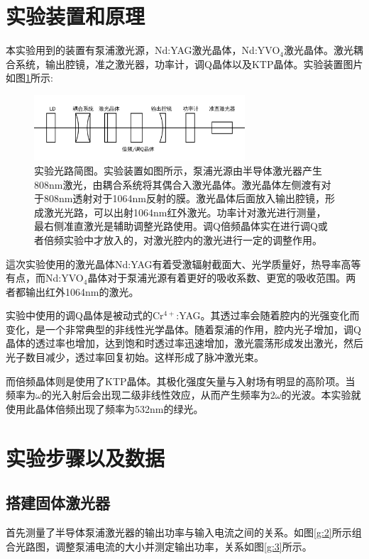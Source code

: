 \documentclass[aps,pre,12pt,preprint,onecolumn,showpacs,showkeys,UTF8]{revtex4-1}
\begin{document}
\section{实验装置和原理}
本实验用到的装置有泵浦激光源，Nd:YAG激光晶体，Nd:YVO$_4$激光晶体。激光耦合系统，输出腔镜，准之激光器，功率计，调Q晶体以及KTP晶体。实验装置图片如图\ref{g:1}所示:
\begin{figure}[h]
	\begin{center}
		\includegraphics[width=0.7\textwidth]{pic1.png}
		\caption{\label{g:1}实验光路简图。实验装置如图所示，泵浦光源由半导体激光器产生808nm激光，由耦合系统将其偶合入激光晶体。激光晶体左侧渡有对于808nm透射对于1064nm反射的膜。激光晶体后面放入输出腔镜，形成激光光路，可以出射1064nm红外激光。功率计对激光进行测量，最右侧准直激光是辅助调整光路使用。调Q倍频晶体实在进行调Q或者倍频实验中才放入的，对激光腔内的激光进行一定的调整作用。}
	\end{center}
\end{figure}

這次实验使用的激光晶体Nd:YAG有着受激辐射截面大、光学质量好，热导率高等有点，而Nd:YVO$_4$晶体对于泵浦光源有着更好的吸收系数、更宽的吸收范围。两者都输出红外1064nm的激光。

实验中使用的调Q晶体是被动式的Cr$^{4+}$:YAG。其透过率会随着腔内的光强变化而变化，是一个非常典型的非线性光学晶体。随着泵浦的作用，腔内光子增加，调Q晶体的透过率也增加，达到饱和时透过率迅速增加，激光震荡形成发出激光，然后光子数目减少，透过率回复初始。这样形成了脉冲激光束。

而倍频晶体则是使用了KTP晶体。其极化强度矢量与入射场有明显的高阶项。当频率为$\omega$的光入射后会出现二级非线性效应，从而产生频率为$2\omega$的光波。本实验就使用此晶体倍频出现了频率为532nm的绿光。

\section{实验步骤以及数据}
\subsection{搭建固体激光器}
首先测量了半导体泵浦激光器的输出功率与输入电流之间的关系。如图\ref{g:2}所示组合光路图，调整泵浦电流的大小并测定输出功率，关系如图\ref{g:3}所示。
\end{document}
